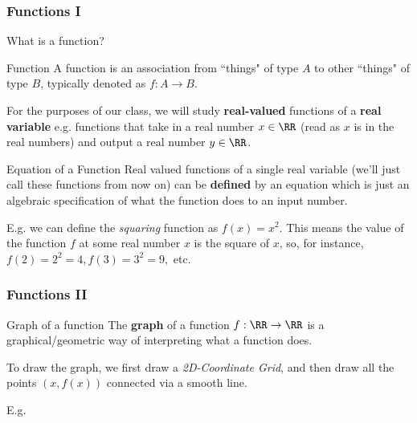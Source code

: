 \documentclass{ltx-talk}
\begin{document}
\begin{frame}
  \frametitle{Functions I}

  What is a function? \pause

  \begin{block}{Function}
    A function is an association from ``things" of type $A$ to
    other ``things" of type $B$, typically denoted as $f : A \rightarrow B$. \pause

    For the purposes of our class, we will study \textbf{real-valued} functions
    of a \textbf{real variable} \pause e.g. functions
    that take in a real number $x \in \RR$ (read as $x$ is in the real numbers)
    and output a real number $y \in \RR$. \pause
  \end{block}

  \begin{block}{Equation of a Function}
    Real valued functions of a single real variable (we'll just call these functions from now on)
    can be \textbf{defined} by an equation  \pause
    which is just an algebraic specification of what the function does to an input number. \pause
  \end{block}

  E.g. we can define the \textit{squaring} function as $f(x) = x^2$. \pause
  This means the value of the function $f$ at some real number $x$ is the square of $x$,
  so, for instance, $f(2) = 2^2 = 4, f(3) = 3^2 = 9,$ etc.
\end{frame}

\begin{frame}
  \frametitle{Functions II}

  \begin{block}{Graph of a function}
    The \textbf{graph} of a function $f : \RR \rightarrow \RR$ \pause
    is a graphical/geometric way of interpreting what a function does. \pause

    To draw the graph, we first draw a \textit{2D-Coordinate Grid}, \pause
    and then draw all the points $(x, f(x))$ connected via a smooth line.
  \end{block}

  E.g. 
\end{frame}
\end{document}
